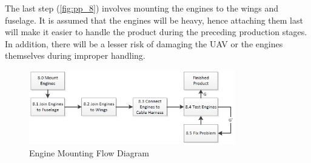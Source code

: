 The last step (\autoref{fig:pp_8}) involves mounting the engines to the wings and fuselage. It is assumed that the engines will be heavy, hence attaching them last will make it easier to handle the product during the preceding production stages. In addition, there will be a lesser risk of damaging the UAV or the engines themselves during improper handling.

\begin{figure}[H]
    \centering
    \includegraphics[width=0.8\textwidth]{ProductionPlan/Figures/pp_8}
    \caption{Engine Mounting Flow Diagram}
    \label{fig:pp_8}
\end{figure}

